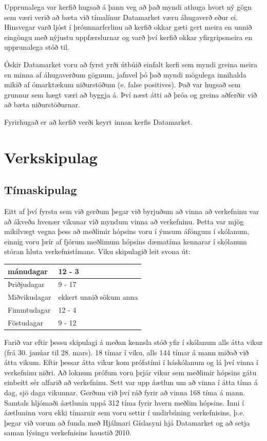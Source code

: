\documentclass{article}
\begin{document}
Upprunalega var kerfið hugsað á þann veg að það myndi athuga hvort ný gögn sem
væri verið að bæta við tímalínur Datamarket væru áhugaverð eður ei. Hinsvegar
varð ljóst í þróunnarferlinu að kerfið okkar gæti gert meira en unnið
eingöngu með nýjustu uppfærslurnar og varð því kerfið okkar yfirgripsmeira en
upprunalega stóð til.

Óskir Datamarket voru að fyrst yrði útbúið einfalt kerfi 
sem myndi greina meira en minna af áhugaverðum gögnum, jafnvel þó það myndi
mögulega 
innihalda mikið af ómarktækum niðurstöðum (e. false positives). Það var hugsað
sem 
grunnur sem hægt væri að byggja á. Því næst átti að þróa og greina aðferðir við
að 
bæta niðurstöðurnar. 

Fyrirhugað er að kerfið verði keyrt innan kerfis Datamarket.
\newpage

\section{Verkskipulag}

\subsection{Tímaskipulag}

Eitt af því fyrsta sem við gerðum þegar við byrjuðum að vinna að verkefninu var
að ákveða hvenær vikunar við myndum vinna að verkefninu. Þetta var mjög
mikilvægt vegna þess að meðlimir hópsins voru í ýmsum áföngum í skólanum, einnig
voru þrír af fjórum meðlimum hópsins dæmatíma kennarar í skólanum stóran hluta
verkefnistímans. 
Viku skipulagið leit svona út:

\vspace{5 mm}
\begin{tabular}{| l | l |}
\hline
  mánudagar & 12 - 3 \\
  \hline
  Þriðjudagar & 9 - 17 \\
  \hline
  Miðvikudagar & ekkert unnið sökum anna \\
  \hline
  Fimmtudagar & 12 - 4 \\
  \hline
  Föstudagar & 9 - 12\\
\hline
\end{tabular}
\vspace{5 mm}

Farið var eftir þessu skipulagi á meðan kennsla stóð yfir í skólanum alls átta
vikur (frá 30. janúar til 28. mars). 18 tímar í viku, alls 144 tímar á mann
miðað við átta vikum.
Eftir þessar átta vikur kom prófatími í háskólanum og lá því vinna í verkefninu
niðri. 
Að loknum prófum voru þrjár vikur sem meðlimir hópsins gátu einbeitt sér alfarið
að verkefninu. Sett var upp áætlun um að vinna í átta tíma á dag, sjö daga
vikunnar. Gerðum við því ráð fyrir að vinna 168 tíma á mann. 
Samtals hljómaði áætlunin uppá 312 tíma fyrir hvern meðlim hópsins. Inni í
áætluninn voru ekki tímarnir sem voru settir í undirbúning verkefnisins, þ.e.
þegar við vorum að funda með Hjálmari Gíslasyni hjá Datamarket og að setja saman
lýsingu verkefnisins haustið 2010.
\end{document}
